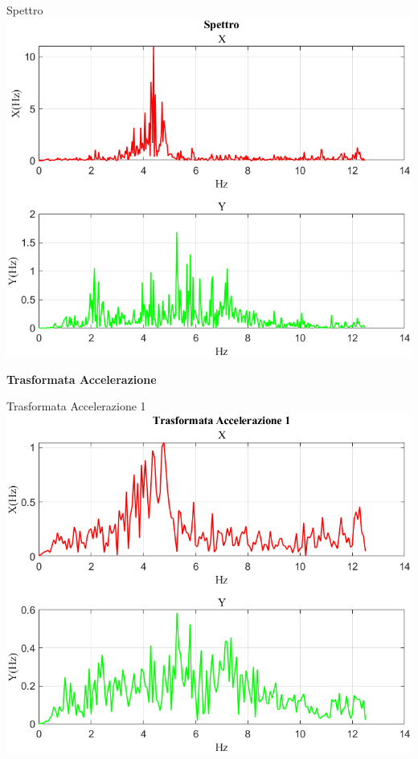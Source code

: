 \documentclass[beamer]{standalone}
\begin{document}
	\begin{frame}{{Spettro}}
		\centering\includegraphics[height=.8\textheight]{figure/Acc/Trasformata/Spettro}
	\end{frame}
	
	\begin{frame}
		\color{blue}\centering\huge{\textbf{Trasformata Accelerazione}}
	\end{frame}
	
	\begin{frame}{{Trasformata Accelerazione 1}}
		\centering\includegraphics[height=.8\textheight]{figure/Acc/Trasformata/Trasformata Accelerazione 1}
	\end{frame}
	
\end{document}
